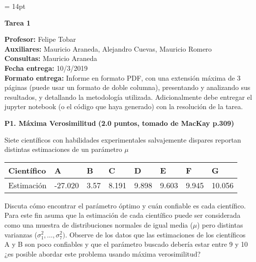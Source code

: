 \documentclass[11pt,letterpaper]{article}
\begin{document}
\pagestyle{fancy}
\fancyhf{}

\headheight = 14pt
\begin{center}
\large {\textbf{Tarea 1}}\\
\end{center}
\textbf{Profesor:} Felipe Tobar\\ 
\textbf{Auxiliares:} Mauricio Araneda, Alejandro Cuevas, Mauricio Romero \\
\textbf{Consultas:} Mauricio Araneda \\
\textbf{Fecha entrega:} 10/3/2019 \\

\noindent\textbf{Formato entrega:} Informe en formato PDF, con una extensión máxima de 3 páginas (puede usar un formato de doble columna), presentando y analizando sus resultados, y detallando la metodología utilizada. Adicionalmente debe entregar el jupyter notebook (o el código que haya generado) con la resolución de la tarea.

\vspace{5mm}

\noindent\textbf{P1. Máxima Verosimilitud} \textbf{(2.0 puntos, tomado de MacKay p.309)}
\vspace{5 mm}

Siete científicos con habilidades experimentales salvajemente dispares reportan distintas estimaciones de un parámetro $\mu$

\begin{table}[H]
\centering
\begin{tabular}{llllllll}
Científico & A       & B    & C     & D     & E     & F     & G      \\ \hline
Estimación & -27.020 & 3.57 & 8.191 & 9.898 & 9.603 & 9.945 & 10.056
\end{tabular}
\end{table}

Discuta cómo encontrar el parámetro óptimo y cuán confiable es cada científico. Para
este fin asuma que la estimación de cada científico puede ser considerada como una muestra de distribuciones normales de igual media ($\mu$) pero distintas varianzas ($\sigma_{1}^2 , \dots , \sigma_{7}^2 )$. Observe de los datos que las estimaciones de los científicos A y B son poco confiables y que el parámetro buscado debería estar entre 9 y 10 ¿es posible abordar este problema usando máxima verosimilitud?
\end{document}
